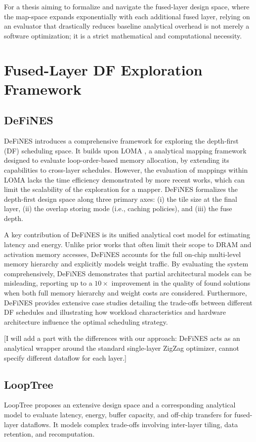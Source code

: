 For a thesis aiming to formalize and navigate the fused-layer design space, where the map-space expands exponentially with each additional fused layer, relying on an evaluator that drastically reduces baseline analytical overhead is not merely a software optimization; it is a strict mathematical and computational necessity.

\section{Fused-Layer DF Exploration Framework}

\subsection{DeFiNES}
DeFiNES \cite{mei2023defines} introduces a comprehensive framework for exploring the depth-first (DF) scheduling space. It builds upon LOMA \cite{Symons2021LOMA}, a analytical mapping framework designed to evaluate loop-order-based memory allocation, by extending its capabilities to cross-layer schedules.
However, the evaluation of mappings within LOMA lacks the time efficiency demonstrated by more recent works\cite{Quickflow}, which can limit the scalability of the exploration for a mapper.
DeFiNES formalizes the depth-first design space along three primary axes: (i) the tile size at the final layer, (ii) the overlap storing mode (i.e., caching policies), and (iii) the fuse depth. 

A key contribution of DeFiNES is its unified analytical cost model for estimating latency and energy. Unlike prior works that often limit their scope to DRAM and activation memory accesses, DeFiNES accounts for the full on-chip multi-level memory hierarchy and explicitly models weight traffic. By evaluating the system comprehensively, DeFiNES demonstrates that partial architectural models can be misleading, reporting up to a $10\times$ improvement in the quality of found solutions when both full memory hierarchy and weight costs are considered. Furthermore, DeFiNES provides extensive case studies detailing the trade-offs between different DF schedules and illustrating how workload characteristics and hardware architecture influence the optimal scheduling strategy.

[I will add a part with the differences with our approach: DeFiNES acts as an analytical wrapper around the standard single-layer ZigZag optimizer, cannot specify different dataflow for each layer.]

\subsection{LoopTree}
LoopTree \cite{gilbert2024looptree} proposes an extensive design space and a corresponding analytical model to evaluate latency, energy, buffer capacity, and off-chip transfers for fused-layer dataflows. It models complex trade-offs involving inter-layer tiling, data retention, and recomputation. 

